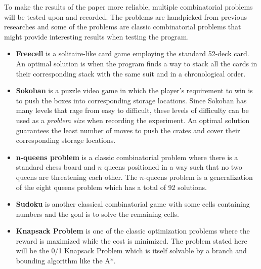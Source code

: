 To make the results of the paper more reliable, multiple combinatorial problems will be tested
upon and recorded. The problems are handpicked from previous researches and some of the problems 
are classic combinatorial problems that might provide interesting results when testing the program.
\begin{itemize}
    \item \textbf{Freecell} is a solitaire-like card game employing the standard 52-deck card. 
        An optimal solution is when the program finds a way to stack all the cards in their 
        corresponding stack with the same suit and in a chronological order.
    \item \textbf{Sokoban} is a puzzle video game in which the player's requirement to win is to 
        push the boxes into corresponding storage locations. Since Sokoban has many levels that 
        rage from easy to difficult, these levels of difficulty can be used as a \emph{problem size} 
        when recording the experiment. An optimal solution guarantees the least number of moves 
        to push the crates and cover their corresponding storage locations.
    \item \textbf{n-queens problem} is a classic combinatorial problem where there is a standard 
        chess board and $n$ queens positioned in a way such that no two queens are threatening each other.
        The $n$-queens problem is a generalization of the eight queens problem which has a total of 
        92 solutions. 
    \item \textbf{Sudoku} is another classical combinatorial game with some cells containing numbers 
        and the goal is to solve the remaining cells.    
    \item \textbf{Knapsack Problem} is one of the classic optimization problems where the reward is maximized 
        while the cost is minimized. The problem stated here will be the 0/1 Knapsack Problem which is itself 
        solvable by a branch and bounding algorithm like the A*.    
\end{itemize}

